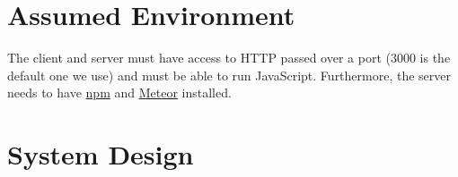 \documentclass[a4paper, 11pt]{article} %
\begin{document}
\section*{Assumed Environment}


The client and server must have access to HTTP passed over a port (3000 is the default one we use) and must be able to run JavaScript. Furthermore, the server needs to have \href{https://www.npmjs.com/}{npm} and \href{https://www.meteor.com/}{Meteor} installed.

\section*{System Design}
\end{document}
